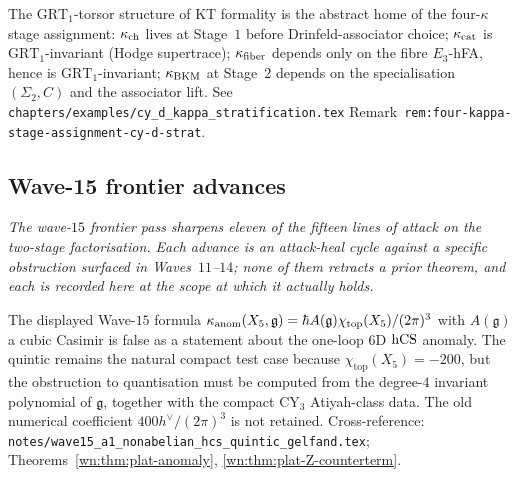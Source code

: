 \begin{remark}
\label{wn:rmk:plat-four-kappa-stage}
The $\mathrm{GRT}_1$-torsor structure of KT formality is the abstract
home of the four-$\kappa$ stage assignment: $\kappa_{\mathrm{ch}}$ lives at Stage~$1$
before Drinfeld-associator choice; $\kappa_{\mathrm{cat}}$ is $\mathrm{GRT}_1$-invariant
(Hodge supertrace); $\kappa_{\mathrm{fiber}}$ depends only on the fibre $E_3$-hFA, hence
is $\mathrm{GRT}_1$-invariant; $\kappa_{\mathrm{BKM}}$ at Stage~$2$ depends on the
specialisation $(\Sigma_2, C)$ and the associator lift. See
\texttt{chapters/examples/cy\_d\_kappa\_stratification.tex}
Remark~\texttt{rem:four-kappa-stage-assignment-cy-d-strat}.
\end{remark}

\subsection{Wave-15 frontier advances}
\label{wn:subsec:plat-wave15-frontier}

\emph{The wave-$15$ frontier pass sharpens eleven of the fifteen lines of
attack on the two-stage factorisation. Each advance is an attack-heal
cycle against a specific obstruction surfaced in Waves~$11$--$14$; none
of them retracts a prior theorem, and each is recorded here at the
scope at which it actually holds.}

\begin{theorem}\ClaimStatusRetracted
\label{wn:thm:plat-w15-nonab-quintic}
The displayed Wave-$15$ formula
$\kappa_{\mathrm{anom}}(X_5,\mathfrak g)=\hbar A(\mathfrak g)\chi_{\mathrm{top}}(X_5)/(2\pi)^3$
with $A(\mathfrak g)$ a cubic Casimir is false as a statement about the
one-loop $6$D $\mathrm{hCS}$ anomaly.  The quintic remains the natural compact
test case because $\chi_{\mathrm{top}}(X_5)=-200$, but the obstruction to
quantisation must be computed from the degree-$4$ invariant polynomial
of $\mathfrak g$, together with the compact CY$_3$ Atiyah-class data.
The old numerical coefficient $400h^\vee/(2\pi)^3$ is not retained.
Cross-reference: \texttt{notes/wave15\_a1\_nonabelian\_hcs\_quintic\_gelfand.tex};
Theorems~\ref{wn:thm:plat-anomaly}, \ref{wn:thm:plat-Z-counterterm}.
\end{theorem}

